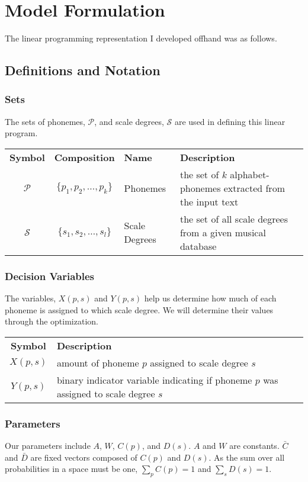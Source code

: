 \section{Model Formulation}
The linear programming representation I developed offhand was as follows.
\subsection{Definitions and Notation}
\subsubsection*{Sets}
The sets of phonemes, $\mathcal{P}$, and scale degrees, $\mathcal{S}$ are used in defining this linear program. 

\begin{tabular}{c c l l}
\textbf{Symbol} & \textbf{Composition} & \textbf{Name} & \textbf{Description} \\
$\mathcal{P}$ & $\{p_1,p_2,\hdots,p_k\}$ & Phonemes & the set of $k$ alphabet-phonemes extracted from the input text\\
$\mathcal{S}$ & $\{s_1,s_2,\hdots,s_l\}$ & Scale Degrees & the set of all scale degrees from a given musical database\\
\end{tabular}

\subsubsection*{Decision Variables}
The variables, $X(p,s)$ and $Y(p,s)$ help us determine how much of each phoneme is assigned to which scale degree. We will determine their values through the optimization. 

\begin{tabular}{c l l}
\textbf{Symbol} & \textbf{Description} \\
$X(p,s)$ & amount of phoneme $p$ assigned to scale degree $s$\\
$Y(p,s)$ & binary indicator variable indicating if phoneme $p$ was assigned to scale degree $s$\\
\end{tabular}

\subsubsection*{Parameters}
Our parameters include $A$, $W$, $C(p)$, and $D(s)$. $A$ and $W$ are constants. $\bar{C}$ and $\bar{D}$ are fixed vectors composed of $C(p)$ and $D(s)$. As the sum over all probabilities in a space must be one, $\sum_p C(p)=1$ and $\sum_s D(s)=1$.

